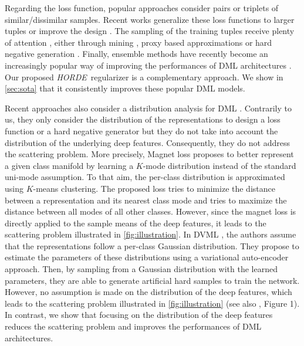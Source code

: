 \documentclass[10pt,twocolumn,letterpaper]{article}
\def\ourmethod{\textit{HORDE}}
\begin{document}
    Regarding the loss function, popular approaches consider pairs \cite{Chopra_CVPR_2005} or triplets \cite{Schroff_2015_CVPR} of similar/dissimilar samples.
    Recent works generalize these loss functions to larger tuples \cite{Chen_2017_CVPR, Song_2016_CVPR, Sohn_2016_NIPS, Ustinova_2016_NIPS} or improve the design \cite{Wang_2018_CVPR, Wang_2017_ICCV, Yu_2018_ECCV}.
    The sampling of the training tuples receive plenty of attention \cite{Song_2016_CVPR, Schroff_2015_CVPR, Sohn_2016_NIPS}, either through mining \cite{Harwood_2017_ICCV, Schroff_2015_CVPR}, proxy based approximations \cite{Movshovitz-Attias_2017_ICCV, Song_2017_CVPR} or hard negative generation \cite{Duan_2018_CVPR, Lin_2018_ECCV}.
    Finally, ensemble methods have recently become an increasingly popular way of improving the performances of DML architectures \cite{Kim_2018_ECCV, Opitz_2017_ICCV, Xuan_2018_ECCV, Yuan_2017_ICCV}.
    Our proposed \ourmethod \ regularizer is a complementary approach.
    We show in \autoref{sec:sota} that it consistently improves these popular DML models.
    
    Recent approaches also consider a distribution analysis for DML \cite{Rippel_2016_ICLR,Lin_2018_ECCV}.
    Contrarily to us, they only consider the distribution of the representations to design a loss function or a hard negative generator but they do not take into account the distribution of the underlying deep features.
    Consequently, they do not address the scattering problem.
More precisely, Magnet loss \cite{Rippel_2016_ICLR} proposes to better represent a given class manifold by learning a $K$-mode distribution instead of the standard uni-mode assumption.
    To that aim, the per-class distribution is approximated using $K$-means clustering.
    The proposed loss tries to minimize the distance between a representation and its nearest class mode and tries to maximize the distance between all modes of all other classes.
    However, since the magnet loss is directly applied to the sample means of the deep features, it leads to the scattering problem illustrated in \autoref{fig:illustration}.
    In DVML \cite{Lin_2018_ECCV}, the authors assume that the representations follow a per-class Gaussian distribution. They propose to estimate the parameters of these distributions using a variational auto-encoder approach.
    Then, by sampling from a Gaussian distribution with the learned parameters, they are able to generate artificial hard samples to train the network.
    However, no assumption is made on the distribution of the deep features, which leads to the scattering problem illustrated in \autoref{fig:illustration} (see also \cite{Lin_2018_ECCV}, Figure 1).
    In contrast, we show that focusing on the distribution of the deep features reduces the scattering problem and improves the performances of DML architectures.
\end{document}
